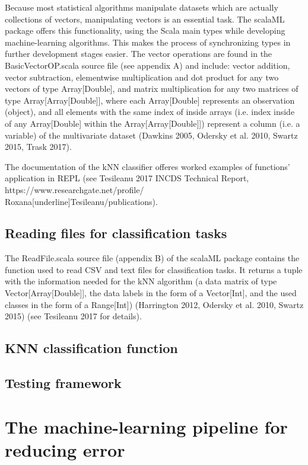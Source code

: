 \documentclass[journal]{IEEEtran}
\begin{document}
Because most statistical algorithms manipulate datasets which are actually collections of vectors, manipulating vectors is an essential task. The scalaML package offers this functionality, using the Scala main types while developing machine-learning algorithms. This makes the process of synchronizing types in further development stages easier.
 The vector operations are found in the BasicVectorOP.scala source file (see appendix A) and include: vector addition, vector subtraction, elementwise multiplication and dot product for any two vectors of type Array[Double], and matrix multiplication for any two matrices of type Array[Array[Double]], where each Array[Double] represents an observation (object), and all elements with the same index of inside arrays (i.e. index inside of any Array[Double] within the Array[Array[Double]]) represent a column (i.e. a variable) of the multivariate dataset (Dawkins 2005, Odersky et al. 2010, Swartz 2015, Trask 2017).

The documentation of the kNN classifier offeres worked examples of functions' application in REPL (see Tesileanu 2017 INCDS Technical Report, https://www.researchgate.net/profile/\\ Roxana[underline]Tesileanu/publications).  

\subsection{Reading files for classification tasks}

The ReadFile.scala source file (appendix B) of the scalaML package contains the function used to read CSV and text files for classification tasks. It returns a tuple with the information needed for the kNN algorithm (a data matrix of type Vector[Array[Double]], the data labels in the form of a Vector[Int],  and the used classes in the form of a Range[Int]) (Harrington 2012, Odersky et al. 2010, Swartz 2015) (see Tesileanu 2017 for details).
 
\subsection{KNN classification function}



\subsection{Testing framework}    

\section{The machine-learning pipeline for reducing error}
\end{document}
